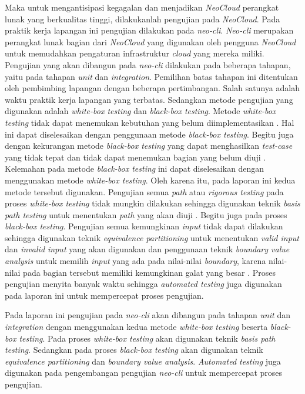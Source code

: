 Maka untuk mengantisipasi kegagalan dan menjadikan \emph{NeoCloud}
perangkat lunak yang berkualitas tinggi, dilakukanlah pengujian pada
\emph{NeoCloud}. Pada praktik kerja lapangan ini pengujian dilakukan
pada \emph{neo-cli}. \emph{Neo-cli} merupakan perangkat lunak bagian
dari \emph{NeoCloud} yang digunakan oleh pengguna \emph{NeoCloud}
untuk memudahkan pengaturan infrastruktur \emph{cloud} yang mereka miliki.
Pengujian yang akan dibangun pada
\emph{neo-cli} dilakukan pada beberapa tahapan, yaitu pada tahapan
\emph{unit} dan \emph{integration}. Pemilihan batas tahapan ini
ditentukan oleh pembimbing lapangan dengan beberapa
pertimbangan. Salah satunya adalah waktu praktik kerja lapangan yang
terbatas. Sedangkan metode pengujian yang digunakan adalah
\emph{white-box testing} dan \emph{black-box testing}. Metode
\emph{white-box testing} tidak dapat menemukan kebutuhan yang belum
diimplementasikan \parencite{dijkstra1970notes}. Hal ini dapat
diselesaikan dengan penggunaan metode \emph{black-box
testing}. Begitu juga dengan kekurangan metode \emph{black-box
testing} yang dapat menghasilkan \emph{test-case} yang tidak tepat dan
tidak dapat menemukan bagian yang belum diuji
\parencite{savenkov2008become}. Kelemahan pada metode
\emph{black-box testing} ini dapat diselesaikan dengan menggunakan
metode \emph{white-box testing}. Oleh karena itu, pada laporan ini
kedua metode tersebut digunakan. Pengujian semua \emph{path} atau
\emph{rigorous testing} pada proses \emph{white-box testing} tidak
mungkin dilakukan sehingga digunakan teknik \emph{basis path
testing} untuk menentukan \emph{path} yang akan diuji
\parencite{gregory2007path}. Begitu juga pada proses \emph{black-box
  testing}. Pengujian semua kemungkinan \emph{input} tidak dapat
dilakukan sehingga digunakan teknik \emph{equivalence partitioning} untuk
menentukan \emph{valid input} dan \emph{invalid input} yang akan
digunakan dan penggunaan teknik \emph{boundary value
  analysis} untuk memilih \emph{input} yang ada pada nilai-nilai
\emph{boundary}, karena nilai-nilai pada bagian tersebut memiliki
kemungkinan galat yang besar \parencite{presman2010software}. Proses
pengujian menyita banyak waktu \parencite{brooks1995mythical} sehingga
\emph{automated testing} juga digunakan pada laporan ini untuk
mempercepat proses pengujian.

Pada laporan ini pengujian pada \emph{neo-cli} akan dibangun pada
tahapan \emph{unit} dan \emph{integration} dengan menggunakan kedua
metode \emph{white-box testing} beserta \emph{black-box
  testing}. Pada proses \emph{white-box testing} akan digunakan teknik
\emph{basis path testing}. Sedangkan pada proses \emph{black-box
  testing} akan digunakan teknik \emph{equivalence partitioning} dan
\emph{boundary value analysis}. \emph{Automated testing} juga
digunakan pada pengembangan pengujian \emph{neo-cli} untuk mempercepat
proses pengujian.

